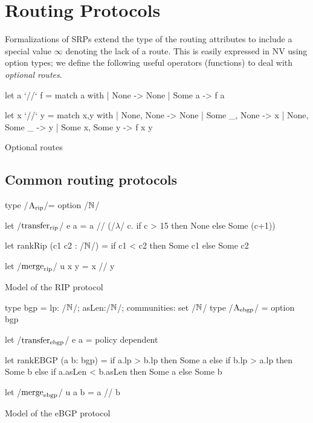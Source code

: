 \documentclass[sigconf,10pt]{acmart}
\begin{document}
\section{Routing Protocols} 

Formalizations of SRPs extend the type of the routing attributes to
include a special value $\infty$ denoting the lack of a route. This is
easily expressed in NV using option types; we define the following
useful operators (functions) to deal with \emph{optional routes}.

\begin{listing}[ht]
\begin{ocamlcode}
  let  a `/\bind/` f =
    match a with
    | None -> None
    | Some a -> f a
    
  let x `//` y =
    match x,y with
    | None, None -> None
    | Some _, None -> x
    | None, Some _ -> y
    | Some x, Some y -> f x y
\end{ocamlcode}
\caption{Optional routes}
\label{lst:options}
\end{listing}

\subsection{Common routing protocols}

\begin{listing}[ht]
\begin{ocamlcode}
  type /$\A_{\rip} $/= option /$\nat$/

  let /$\transfer_{\rip}$/ e a =
    a /\bind/ (/$\lambda$/ c. if c > 15 then None else Some (c+1))

  let rankRip (c1 c2 : /$\nat$/) =
     if c1 < c2 then Some c1 else Some c2
   
  let /$\merge_{\rip}$/ u x y = x // y
\end{ocamlcode}
\caption{Model of the RIP protocol}
\label{lst:rip}
\end{listing}

\begin{listing}[ht]
  \begin{ocamlcode}
  type bgp = {lp: /$\nat$/; asLen:/$\nat$/; communities: set /$\nat$/ }
  type /$\A_{\ebgp}$/ = option bgp

  let /$\transfer_{\ebgp}$/ e a = policy dependent

  let rankEBGP (a b: bgp)  =
    if a.lp > b.lp then Some a
    else if b.lp > a.lp then Some b
    else if a.asLen < b.asLen then Some a
    else Some b

  let /$\merge_{\ebgp}$/ u a b = a // b
\end{ocamlcode}
\caption{Model of the eBGP protocol}
\label{lst:ebgp}
\end{listing}
  
\end{document}
